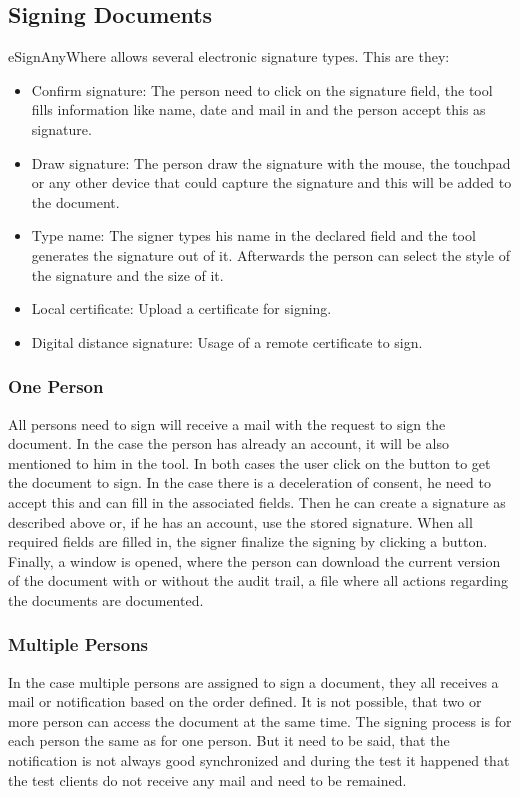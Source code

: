 \subsection{Signing Documents}
eSignAnyWhere allows several electronic signature types. This are they:
\begin{itemize}
	\item Confirm signature: The person need to click on the signature field, the tool fills information like name, date and mail in and the person accept this as signature.
	\item Draw signature: The person draw the signature with the mouse, the touchpad or any other device that could capture the signature and this will be added to the document.
	\item Type name: The signer types his name in the declared field and the tool generates the signature out of it. Afterwards the person can select the style of the signature and the size of it.
	\item Local certificate: Upload a certificate for signing.
	\item Digital distance signature: Usage of a remote certificate to sign.
\end{itemize}

\subsubsection{One Person}
All persons need to sign will receive a mail with the request to sign the document. In the case the person has already an account, it will be also mentioned to him in the tool. In both cases the user click on the button to get the document to sign. In the case there is a deceleration of consent, he need to accept this and can fill in the associated fields. Then he can create a signature as described above or, if he has an account, use the stored signature. When all required fields are filled in, the signer finalize the signing by clicking a button. Finally, a window is opened, where the person can download the current version of the document with or without the audit trail, a file where all actions regarding the documents are documented. 

\subsubsection{Multiple Persons}
In the case multiple persons are assigned to sign a document, they all receives a mail or notification based on the order defined. It is not possible, that two or more person can access the document at the same time. The signing process is for each person the same as for one person. But it need to be said, that the notification is not always good synchronized and during the test it happened that the test clients do not receive any mail and need to be remained.


